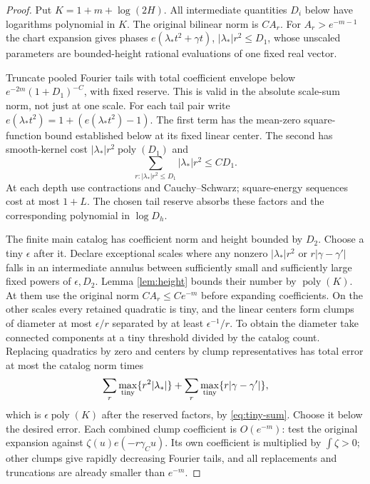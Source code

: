 \documentclass[11pt]{article}
\theoremstyle{definition}
\newcommand{\poly}{\operatorname{poly}}
\numberwithin{equation}{section}
\begin{document}
\begin{proof}
Put $K=1+m+\log(2H)$. All intermediate quantities $D_i$ below have logarithms polynomial in $K$. The original bilinear norm is $CA_r$. For $A_r>e^{-m-1}$ the chart expansion gives phases $e(\lambda_*t^2+\gamma t)$, $|\lambda_*|r^2\le D_1$, whose unscaled parameters are bounded-height rational evaluations of one fixed real vector.

Truncate pooled Fourier tails with total coefficient envelope below $e^{-2m}(1+D_1)^{-C}$, with fixed reserve. This is valid in the absolute scale-sum norm, not just at one scale. For each tail pair write $e(\lambda_*t^2)=1+(e(\lambda_*t^2)-1)$. The first term has the mean-zero square-function bound established below at its fixed linear center. The second has smooth-kernel cost $|\lambda_*|r^2\poly(D_1)$ and
\[
 \sum_{r:|\lambda_*|r^2\le D_1}|\lambda_*|r^2\le CD_1.
\]
At each depth use contractions and Cauchy--Schwarz; square-energy sequences cost at most $1+L$. The chosen tail reserve absorbs these factors and the corresponding polynomial in $\log D_h$.

The finite main catalog has coefficient norm and height bounded by $D_2$. Choose a tiny $\epsilon$ after it. Declare exceptional scales where any nonzero $|\lambda_*|r^2$ or $r|\gamma-\gamma'|$ falls in an intermediate annulus between sufficiently small and sufficiently large fixed powers of $\epsilon,D_2$. Lemma \ref{lem:height} bounds their number by $\poly(K)$. At them use the original norm $CA_r\le Ce^{-m}$ before expanding coefficients. On the other scales every retained quadratic is tiny, and the linear centers form clumps of diameter at most $\epsilon/r$ separated by at least $\epsilon^{-1}/r$. To obtain the diameter take connected components at a tiny threshold divided by the catalog count. Replacing quadratics by zero and centers by clump representatives has total error at most the catalog norm times
\[
 \sum_r\max_{\rm tiny}\{r^2|\lambda_*|\}
 +\sum_r\max_{\rm tiny}\{r|\gamma-\gamma'|\},
\]
which is $\epsilon\poly(K)$ after the reserved factors, by \eqref{eq:tiny-sum}. Choose it below the desired error. Each combined clump coefficient is $O(e^{-m})$: test the original expansion against $\zeta(u)e(-r\gamma_Cu)$. Its own coefficient is multiplied by $\int\zeta>0$; other clumps give rapidly decreasing Fourier tails, and all replacements and truncations are already smaller than $e^{-m}$.


\end{proof}
\end{document}

